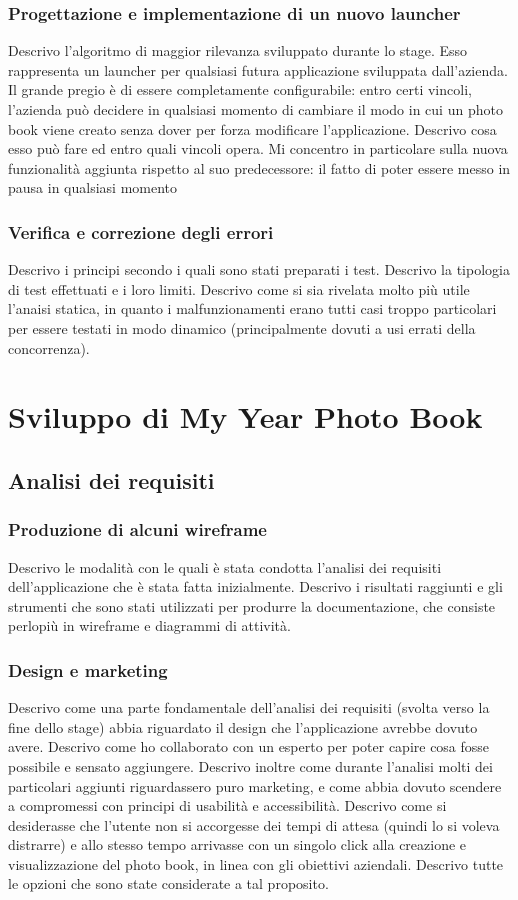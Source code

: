 			\subsubsection{Progettazione e implementazione di un nuovo launcher}
				Descrivo l'algoritmo di maggior rilevanza sviluppato durante lo stage. Esso rappresenta un launcher per qualsiasi
				futura applicazione sviluppata dall'azienda. Il grande pregio è di essere completamente configurabile: entro certi
				vincoli, l'azienda può decidere in qualsiasi momento di cambiare il modo in cui un photo book viene creato senza
				dover per forza modificare l'applicazione. Descrivo cosa esso può fare ed entro quali vincoli opera. Mi concentro
				in particolare sulla nuova funzionalità aggiunta rispetto al suo predecessore: il fatto di poter essere messo in
				pausa in qualsiasi momento
			\subsubsection{Verifica e correzione degli errori}
				Descrivo i principi secondo i quali sono stati preparati i test. Descrivo la tipologia di test effettuati e i loro
				limiti. Descrivo come si sia rivelata molto più utile l'anaisi statica, in quanto i malfunzionamenti erano tutti
				casi troppo particolari per essere testati in modo dinamico (principalmente dovuti a usi errati della concorrenza).
	\section{Sviluppo di My Year Photo Book}
		\subsection{Analisi dei requisiti}
			\subsubsection{Produzione di alcuni wireframe}
				Descrivo le modalità con le quali è stata condotta l'analisi dei requisiti dell'applicazione che è stata fatta
				inizialmente. Descrivo i risultati raggiunti e gli strumenti che sono stati utilizzati per produrre la
				documentazione, che consiste perlopiù in wireframe e diagrammi di attività.
			\subsubsection{Design e marketing}
				Descrivo come una parte fondamentale dell'analisi dei requisiti (svolta verso la fine dello stage) abbia riguardato
				il design che l'applicazione avrebbe dovuto avere. Descrivo come ho collaborato con un esperto per poter capire
				cosa fosse possibile e sensato aggiungere. Descrivo inoltre come durante l'analisi molti dei particolari aggiunti
				riguardassero puro marketing, e come abbia dovuto scendere a compromessi con principi di usabilità e accessibilità.
				Descrivo come si desiderasse che l'utente non si accorgesse dei tempi di attesa (quindi lo si voleva distrarre) e
				allo stesso tempo arrivasse con un singolo click alla creazione e visualizzazione del photo book, in linea con
				gli obiettivi aziendali. Descrivo tutte le opzioni che sono state considerate a tal proposito.
